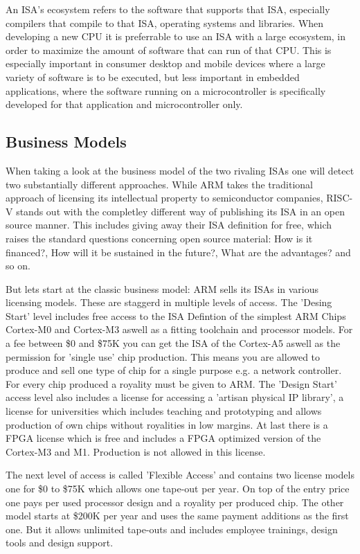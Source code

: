 \documentclass[conference]{IEEEtran}
\begin{document}
An \gls{ISA}'s ecosystem refers to the software that supports that \gls{ISA}, especially compilers that compile to that \gls{ISA}, operating systems and libraries.
When developing a new \gls{CPU} it is preferrable to use an \gls{ISA} with a large ecosystem, in order to maximize the amount of software
that can run of that \gls{CPU}. This is especially important in consumer desktop and mobile devices where a large variety of software is to be executed,
but less important in embedded applications, where the software running on a microcontroller is specifically developed for that application and microcontroller
only.

	\subsection{Business Models}
	When taking a look at the business model of the two rivaling \glspl{ISA} one will detect two substantially different approaches. While ARM takes the traditional approach of licensing its intellectual property to semiconductor companies, RISC-V stands out with the completley different way of publishing its \gls{ISA} in an open source manner. This includes giving away their \gls{ISA} definition for free, which raises the standard questions concerning open source material: How is it financed?, How will it be sustained in the future?, What are the advantages? and so on.

	But lets start at the classic business model: ARM sells its \glspl{ISA} in various licensing models. \cite{ARMLC} These are staggerd in multiple levels of access. The 'Desing Start' level includes free access to the \gls{ISA} Defintion of the simplest ARM Chips Cortex-M0 and Cortex-M3 aswell as a fitting toolchain and processor models. For a fee between \$0 and \$75K you can get the \gls{ISA} of the Cortex-A5 aswell as the permission for 'single use' chip production. This means you are allowed to produce and sell one type of chip for a single purpose e.g. a network controller. For every chip produced a royality must be given to ARM. The 'Design Start' access level also includes a license for accessing a 'artisan physical IP library', a license for universities which includes teaching and prototyping and allows production of own chips without royalities in low margins. At last there is a \acrshort{FPGA} license which is free and includes a \gls{FPGA} optimized version of the Cortex-M3 and M1. Production is not allowed in this license.

	The next level of access is called 'Flexible Access' and contains two license models one for \$0 to \$75K which allows one tape-out per year. On top of the entry price one pays per used processor design and a royality per produced chip. The other model starts at \$200K per year and uses the same payment additions as the first one. But it allows unlimited tape-outs and includes employee trainings, design tools and design support.
\end{document}
